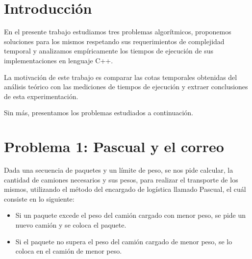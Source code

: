 \documentclass[a4paper, 10pt, twoside]{article}
\begin{document}
\newpage




\tableofcontents

\newpage




\section{Introducción}

En el presente trabajo estudiamos tres problemas algorítmicos, proponemos soluciones para los mismos respetando sus requerimientos de complejidad temporal y analizamos empíricamente los tiempos de ejecución de sus implementaciones en lenguaje C++.

La motivación de este trabajo es comparar las cotas temporales obtenidas del análisis teórico con las mediciones de tiempos de ejecución y extraer conclusiones de esta experimentación.

Sin más, presentamos los problemas estudiados a continuación.




\newpage

\section{Problema 1: Pascual y el correo}

Dada una secuencia de paquetes y un límite de peso, se nos pide calcular, la cantidad de camiones necesarios y sus pesos, para realizar el transporte de los mismos, utilizando el método del encargado de logística llamado Pascual, el cuál consiste en lo siguiente:

\begin{itemize}
\item Si un paquete excede el peso del camión cargado con menor peso, se pide un nuevo camión y se coloca el paquete.
\item Si el paquete no supera el peso del camión cargado de menor peso, se lo coloca en el camión de menor peso.
\end{itemize}
\end{document}
